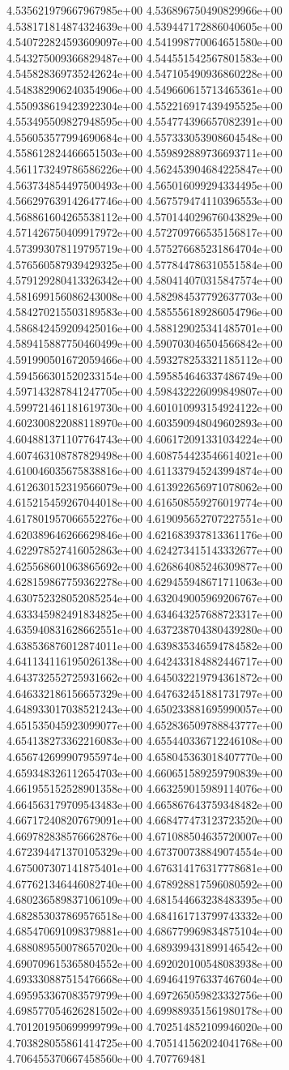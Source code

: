 4.535621979667967985e+00	4.536896750490829966e+00	4.538171814874324639e+00	4.539447172886040605e+00	4.540722824593609097e+00	4.541998770064651580e+00	4.543275009366829487e+00	4.544551542567801583e+00	4.545828369735242624e+00	4.547105490936860228e+00	4.548382906240354906e+00	4.549660615713465361e+00	4.550938619423922304e+00	4.552216917439495525e+00	4.553495509827948595e+00	4.554774396657082391e+00	4.556053577994690684e+00	4.557333053908604548e+00	4.558612824466651503e+00	4.559892889736693711e+00	4.561173249786586226e+00	4.562453904684225847e+00	4.563734854497500493e+00	4.565016099294334495e+00	4.566297639142647746e+00	4.567579474110396553e+00	4.568861604265538112e+00	4.570144029676043829e+00	4.571426750409917972e+00	4.572709766535156817e+00	4.573993078119795719e+00	4.575276685231864704e+00	4.576560587939429325e+00	4.577844786310551584e+00	4.579129280413326342e+00	4.580414070315847574e+00	4.581699156086243008e+00	4.582984537792637703e+00	4.584270215503189583e+00	4.585556189286054796e+00	4.586842459209425016e+00	4.588129025341485701e+00	4.589415887750460499e+00	4.590703046504566842e+00	4.591990501672059466e+00	4.593278253321185112e+00	4.594566301520233154e+00	4.595854646337486749e+00	4.597143287841247705e+00	4.598432226099849807e+00	4.599721461181619730e+00	4.601010993154924122e+00	4.602300822088118970e+00	4.603590948049602893e+00	4.604881371107764743e+00	4.606172091331034224e+00	4.607463108787829498e+00	4.608754423546614021e+00	4.610046035675838816e+00	4.611337945243994874e+00	4.612630152319566079e+00	4.613922656971078062e+00	4.615215459267044018e+00	4.616508559276019774e+00	4.617801957066552276e+00	4.619095652707227551e+00	4.620389646266629846e+00	4.621683937813361176e+00	4.622978527416052863e+00	4.624273415143332677e+00	4.625568601063865692e+00	4.626864085246309877e+00	4.628159867759362278e+00	4.629455948671711063e+00	4.630752328052085254e+00	4.632049005969206767e+00	4.633345982491834825e+00	4.634643257688723317e+00	4.635940831628662551e+00	4.637238704380439280e+00	4.638536876012874011e+00	4.639835346594784582e+00	4.641134116195026138e+00	4.642433184882446717e+00	4.643732552725931662e+00	4.645032219794361872e+00	4.646332186156657329e+00	4.647632451881731797e+00	4.648933017038521243e+00	4.650233881695990057e+00	4.651535045923099077e+00	4.652836509788843777e+00	4.654138273362216083e+00	4.655440336712246108e+00	4.656742699907955974e+00	4.658045363018407770e+00	4.659348326112654703e+00	4.660651589259790839e+00	4.661955152528901358e+00	4.663259015989114076e+00	4.664563179709543483e+00	4.665867643759348482e+00	4.667172408207679091e+00	4.668477473123723520e+00	4.669782838576662876e+00	4.671088504635720007e+00	4.672394471370105329e+00	4.673700738849074554e+00	4.675007307141875401e+00	4.676314176317778681e+00	4.677621346446082740e+00	4.678928817596080592e+00	4.680236589837106109e+00	4.681544663238483395e+00	4.682853037869576518e+00	4.684161713799743332e+00	4.685470691098379881e+00	4.686779969834875104e+00	4.688089550078657020e+00	4.689399431899146542e+00	4.690709615365804552e+00	4.692020100548083938e+00	4.693330887515476668e+00	4.694641976337467604e+00	4.695953367083579799e+00	4.697265059823332756e+00	4.698577054626281502e+00	4.699889351561980178e+00	4.701201950699999799e+00	4.702514852109946020e+00	4.703828055861414725e+00	4.705141562024041768e+00	4.706455370667458560e+00	4.707769481